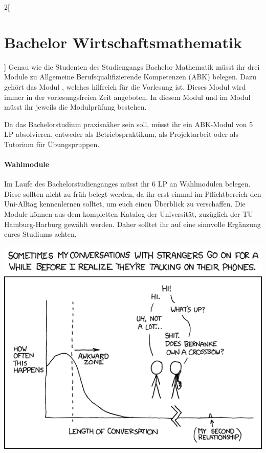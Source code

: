 \begin{multicols}{2}[\section{Bachelor Wirtschaftsmathematik}]
Genau wie die Studenten des Studiengangs Bachelor Mathematik müsst ihr drei
Module zu Allgemeine Berufsqualifizierende Kompetenzen (ABK) belegen. Dazu
gehört das Modul , welches hilfreich für die
Vorlesung  ist. Dieses Modul wird immer in
der vorlesungsfreien Zeit angeboten. In diesem Modul und im Modul
 müsst ihr jeweils die Modulprüfung bestehen.

Da das Bachelorstudium praxisnäher sein soll, müsst ihr ein ABK-Modul von 5 LP
absolvieren, entweder als Betriebspraktikum, als Projektarbeit oder als
Tutorium für Übungspruppen.

\paragraph{Wahlmodule}

Im Laufe des Bachelorstudienganges müsst ihr 6 LP an Wahlmodulen belegen. Diese
sollten nicht zu früh belegt werden, da ihr erst einmal im Pflichtbereich den
Uni-Alltag kennenlernen solltet, um euch einen Überblick zu verschaffen. Die
Module können aus dem kompletten Katalog der Universität, zuzüglich der TU
Hamburg-Harburg gewählt werden. Daher solltet ihr auf eine sinnvolle Ergänzung
eures Studiums achten.

\begin{center}
\vfill\includegraphics[scale=.55]{comics/476}
\end{center}

\end{multicols}

